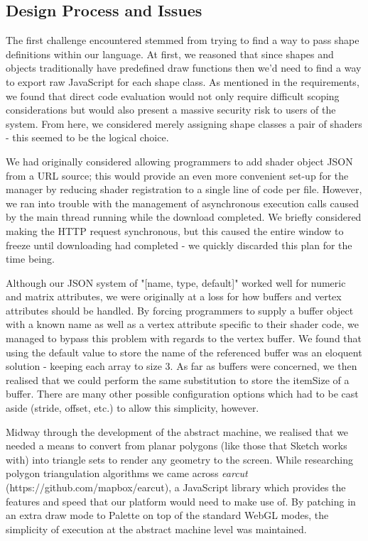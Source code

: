 \documentclass{l3proj}
\begin{document}
\subsection{Design Process and Issues}
\label{arch-shad-design}
The first challenge encountered stemmed from trying to find a way to pass shape definitions within our language. At first, we reasoned that since shapes and objects traditionally have predefined draw functions then we'd need to find a way to export raw JavaScript for each shape class. As mentioned in the requirements, we found that direct code evaluation would not only require difficult scoping considerations but would also present a massive security risk to users of the system. From here, we considered merely assigning shape classes a pair of shaders - this seemed to be the logical choice.

We had originally considered allowing programmers to add shader object JSON from a URL source; this would provide an even more convenient set-up for the manager by reducing shader registration to a single line of code per file. However, we ran into trouble with the management of asynchronous execution calls caused by the main thread running while the download completed. We briefly considered making the HTTP request synchronous, but this caused the entire window to freeze until downloading had completed - we quickly discarded this plan for the time being.

Although our JSON system of "[name, type, default]" worked well for numeric and matrix attributes, we were originally at a loss for how buffers and vertex attributes should be handled. By forcing programmers to supply a buffer object with a known name as well as a vertex attribute specific to their shader code, we managed to bypass this problem with regards to the vertex buffer. We found that using the default value to store the name of the referenced buffer was an eloquent solution - keeping each array to size 3. As far as buffers were concerned, we then realised that we could perform the same substitution to store the itemSize of a buffer. There are many other possible configuration options which had to be cast aside (stride, offset, etc.) to allow this simplicity, however.

Midway through the development of the abstract machine, we realised that we needed a means to convert from planar polygons (like those that Sketch works with) into triangle sets to render any geometry to the screen. While researching polygon triangulation algorithms we came across \textit{earcut} (https://github.com/mapbox/earcut), a JavaScript library which provides the features and speed that our platform would need to make use of. By patching in an extra draw mode to Palette on top of the standard WebGL modes, the simplicity of execution at the abstract machine level was maintained.
\end{document}
